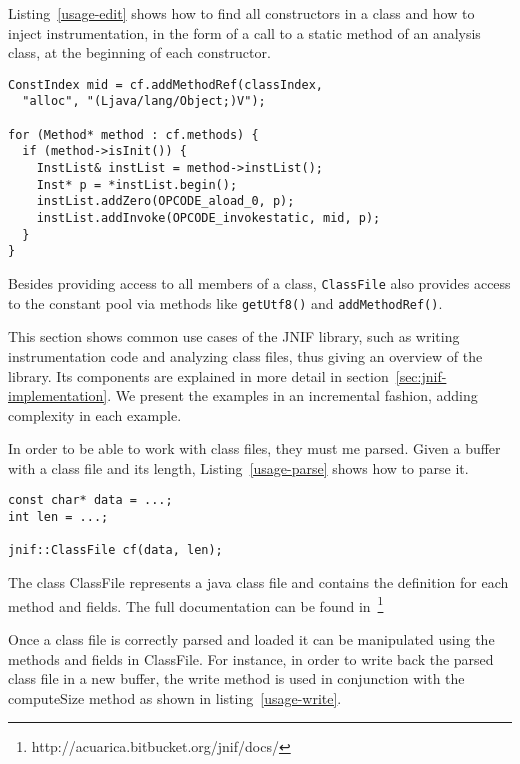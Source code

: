 Listing~\ref{usage-edit} shows how to find all constructors in a class
and how to inject instrumentation, in the form of a call to a static method
 of an analysis class,
at the beginning of each constructor.

\begin{lstlisting}[caption=Instrumenting constructor entries,label=usage-edit]
ConstIndex mid = cf.addMethodRef(classIndex, 
  "alloc", "(Ljava/lang/Object;)V");

for (Method* method : cf.methods) {
  if (method->isInit()) {
    InstList& instList = method->instList();
    Inst* p = *instList.begin();
    instList.addZero(OPCODE_aload_0, p);
    instList.addInvoke(OPCODE_invokestatic, mid, p);
  }
}
\end{lstlisting}

Besides providing access to all members of a class,
\texttt{ClassFile} also provides access to the constant pool
via methods like \texttt{getUtf8()} and \texttt{addMethodRef()}.



This section shows common use cases of the JNIF library, 
such as writing instrumentation code and analyzing class files, 
thus giving an overview of the library. 
Its components are explained in more detail in section~\ref{sec:jnif-implementation}.
We present the examples in an incremental fashion, adding complexity in each example.

In order to be able to work with class files, they must me parsed. 
Given a buffer with a class file and its length, Listing~\ref{usage-parse} shows how to parse it.

\begin{lstlisting}[caption=Decoding a class,label=usage-parse]
const char* data = ...;
int len = ...;

jnif::ClassFile cf(data, len);
\end{lstlisting}

The class ClassFile represents a java class file and contains the definition for each method and fields. 
The full documentation can be found in~\footnote{http://acuarica.bitbucket.org/jnif/docs/}

Once a class file is correctly parsed and loaded it can be manipulated using the methods and fields in ClassFile. 
For instance, in order to write back the parsed class file in a new buffer, 
the write method is used in conjunction with the computeSize method as shown in listing~\ref{usage-write}.


